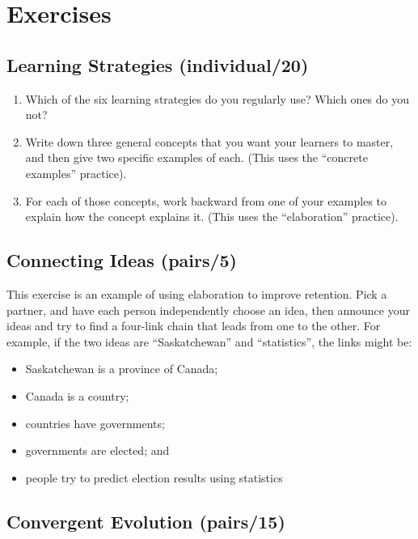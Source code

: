 \section{Exercises}\label{s:individual-exercises}

\subsection{Learning Strategies (individual/20)}\label{learning-strategies-individual20}

\begin{enumerate}
\item
  Which of the six learning strategies do you regularly use? Which
  ones do you not?
\item
  Write down three general concepts that you want your learners to
  master, and then give two specific examples of each. (This uses the
  ``concrete examples'' practice).
\item
  For each of those concepts, work backward from one of your examples
  to explain how the concept explains it. (This uses the ``elaboration''
  practice).
\end{enumerate}

\subsection{Connecting Ideas (pairs/5)}\label{connecting-ideas-pairs5}

This exercise is an example of using elaboration to improve
retention. Pick a partner, and have each person independently choose an
idea, then announce your ideas and try to find a four-link chain that
leads from one to the other. For example, if the two ideas are
``Saskatchewan'' and ``statistics'', the links might be:

\begin{itemize}
\item
  Saskatchewan is a province of Canada;
\item
  Canada is a country;
\item
  countries have governments;
\item
  governments are elected; and
\item
  people try to predict election results using statistics
\end{itemize}

\subsection{Convergent Evolution (pairs/15)}\label{convergent-evolution-pairs15}

